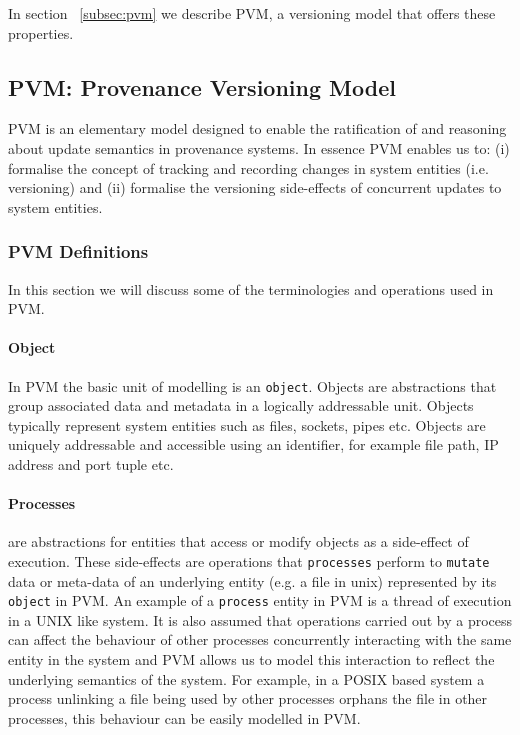 \documentclass[withindex,glossary]{cam-thesis}
\begin{document}
In section ~\ref{subsec:pvm} we describe PVM, a versioning model that offers these properties.

\subsection{PVM: Provenance Versioning Model}
PVM is an elementary model designed to enable the ratification of and reasoning about update semantics in provenance systems.
In essence PVM enables us to:
(i) formalise the concept of tracking and recording changes in system entities (i.e. versioning) and
(ii) formalise the versioning side-effects of concurrent updates to system entities.

\subsubsection{PVM Definitions}
In this section we will discuss some of the terminologies and operations used in PVM.

\paragraph{Object}
In PVM the basic unit of modelling is an \texttt{object}.
Objects are abstractions that group associated data and metadata in a logically addressable unit.
Objects typically represent system entities such as files, sockets, pipes etc.
Objects are uniquely addressable and accessible using an identifier, for example file path, IP address and port tuple etc.

\paragraph{Processes} are abstractions for entities that access or modify objects as a side-effect of execution.
These side-effects are operations that \texttt{processes} perform to \texttt{mutate} data or meta-data of an underlying entity (e.g. a file in unix) represented by its \texttt{object} in PVM.
An example of a \texttt{process} entity in PVM is a thread of execution in a UNIX like system.
It is also assumed that operations carried out by a process can affect the behaviour of other processes concurrently interacting with the same entity in the system and PVM allows us to model this interaction to reflect the underlying semantics of the system.
For example, in a POSIX based system a process unlinking a file being used by other processes orphans the file in other processes, this behaviour can be easily modelled in PVM.
\end{document}
